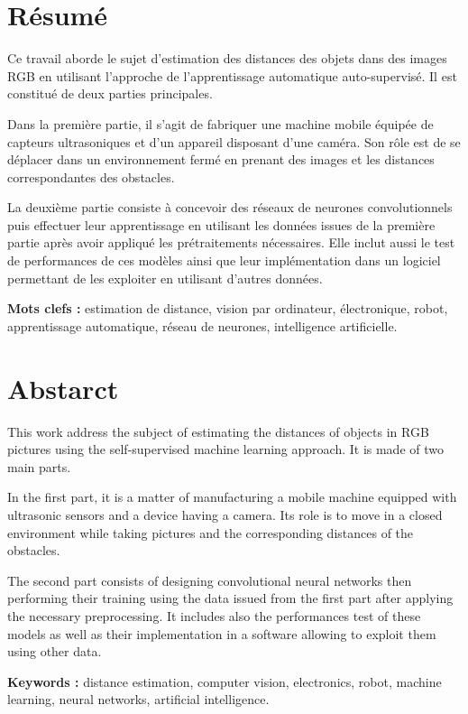 \begin{titlepage}

  \vspace*{\fill}

  \section*{\LARGE Résumé}

  Ce travail aborde le sujet d'estimation des distances des objets dans des images
  RGB en utilisant l'approche de l'apprentissage automatique auto-supervisé.
  Il est constitué de deux parties principales.

  Dans la première partie, il s'agit de fabriquer une machine mobile équipée de
  capteurs ultrasoniques et d'un appareil disposant d'une caméra. Son rôle
  est de se déplacer dans un environnement fermé en prenant des images et les
  distances correspondantes des obstacles.

  La deuxième partie consiste à concevoir des réseaux de neurones convolutionnels
  puis effectuer leur apprentissage en utilisant les données issues de la première
  partie après avoir appliqué les prétraitements nécessaires. Elle inclut aussi
  le test de performances de ces modèles ainsi que leur implémentation dans un
  logiciel permettant de les exploiter en utilisant d'autres données.

  \textbf{Mots clefs :} estimation de distance, vision par ordinateur,
  électronique, robot, apprentissage automatique, réseau de neurones, intelligence artificielle.

  \vspace{0.5em}

  \section*{\LARGE Abstarct}

  This work address the subject of estimating the distances of objects in RGB pictures
  using the self-supervised machine learning approach. It is made of two main parts.

  In the first part, it is a matter of manufacturing a mobile machine equipped with
  ultrasonic sensors and a device having a camera. Its role is to move in a closed
  environment while taking pictures and the corresponding distances of the obstacles.

  The second part consists of designing convolutional neural networks then performing
  their training using the data issued from the first part after applying the
  necessary preprocessing. It includes also the performances test of these models
  as well as their implementation in a software allowing to exploit them using
  other data.

  \textbf{Keywords :} distance estimation, computer vision,
  electronics, robot, machine learning, neural networks, artificial intelligence.

  \vspace*{\fill}

\end{titlepage}
